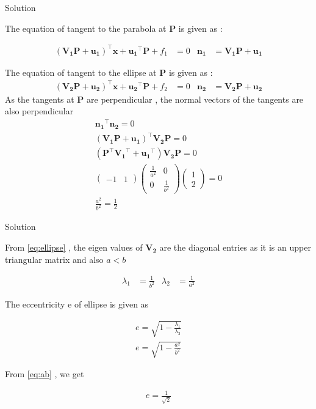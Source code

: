 \documentclass{beamer}
\numberwithin{equation}{section}
\theoremstyle{remark}
\newcommand{\myvec}[1]{\ensuremath{\begin{pmatrix}#1\end{pmatrix}}}
\let\vec\mathbf
\begin{document}
\begin{frame}{Solution}

The equation of tangent to the parabola at $\vec{P}$ is given as :

\begin{align}
  (\vec{V_1}\vec{P}+\vec{u_1})^\top\vec{x} + \vec{u_1}^\top\vec{P} + f_1 &= 0 & \vec{n_1} &= \vec{V_1}\vec{P}+\vec{u_1} 
\end{align}

The equation of tangent to the ellipse at $\vec{P}$ is given as :
\begin{align}
  (\vec{V_2}\vec{P}+\vec{u_2})^\top\vec{x} + \vec{u_2}^\top\vec{P} + f_2 &= 0 & \vec{n_2} &= \vec{V_2}\vec{P}+\vec{u_2} 
\end{align}
As the tangents at $\vec{P}$ are perpendicular , the normal vectors of the tangents are also perpendicular 
\begin{align}
  \vec{n_1}^\top\vec{n_2} = 0\\
  (\vec{V_1}\vec{P}+\vec{u_1})^\top\vec{V_2}\vec{P} = 0\\
  (\vec{P}^\top\vec{V_1}^\top+\vec{u_1}^\top)\vec{V_2}\vec{P} = 0\\
  \myvec{-1 & 1}\myvec{\tfrac{1}{a^2} & 0\\0 & \tfrac{1}{b^2}}\myvec{1\\2} = 0\\
  \frac{a^2}{b^2} = \frac{1}{2} \label{eq:ab} 
\end{align}

\end{frame}

\begin{frame}{Solution}

From \eqref{eq:ellipse} , the eigen values of $\vec{V_2}$ are the diagonal entries as it is an upper triangular matrix and also $a<b$

\begin{align}
  \lambda_1 &= \frac{1}{b^2} & \lambda_2 &= \frac{1}{a^2}
\end{align}

The eccentricity e of ellipse is given as 

\begin{align}
  e = \sqrt{1 - \frac{\lambda_1}{\lambda_2}}\\
  e = \sqrt{1 - \frac{a^2}{b^2}}
\end{align}

From \eqref{eq:ab} , we get 

\begin{align}
  e = \frac{1}{\sqrt{2}}
\end{align}

\end{frame}
\end{document}
